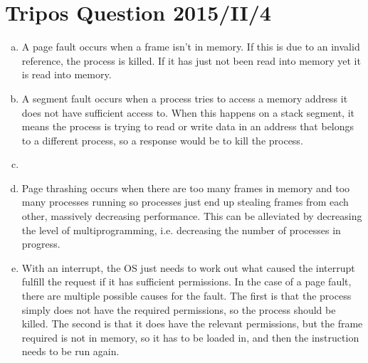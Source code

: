 \documentclass[12pt]{article}
\begin{document}
\section*{Tripos Question 2015/II/4}
\begin{enumerate}[(a)]
    \item A page fault occurs when a frame isn't in memory. If this is due to an invalid reference, the process is killed. If it has just not been read into memory yet it is read into memory.
    \item A segment fault occurs when a process tries to access a memory address it does not have sufficient access to. When this happens on a stack segment, it means the process is trying to read or write data in an address that belongs to a different process, so a response would be to kill the process.
    \item 
    \item Page thrashing occurs when there are too many frames in memory and too many processes running so processes just end up stealing frames from each other, massively decreasing performance. This can be alleviated by decreasing the level of multiprogramming, i.e. decreasing the number of processes in progress.
    \item With an interrupt, the OS just needs to work out what caused the interrupt fulfill the request if it has sufficient permissions. In the case of a page fault, there are multiple possible causes for the fault. The first is that the process simply does not have the required permissions, so the process should be killed. The second is that it does have the relevant permissions, but the frame required is not in memory, so it has to be loaded in, and then the instruction needs to be run again.
\end{enumerate}
\end{document}
